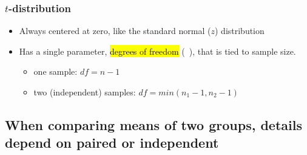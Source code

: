 \documentclass[slidestop,compress,mathserif,12pt,t,professionalfonts,xcolor=table]{beamer}
\newcommand{\soln}[1]{}
\begin{document}

\begin{frame}
\frametitle{$t$-distribution}

\begin{itemize}

\item Always centered at zero, like the standard normal ($z$) distribution

\pause

\item Has a single parameter, \hl{degrees of freedom} (~), that is tied to sample size.
\begin{itemize}
\item one sample: $df = n - 1$
\item two (independent) samples: $df = min(n_1 - 1, n_2 - 1)$
\end{itemize}

\end{itemize}

\pause

{
\soln{\pause Approaches normal.}
\pause
{}
}

\end{frame}


\subsection{When comparing means of two groups, details depend on paired or independent}
\label{mi2}

\end{document}
